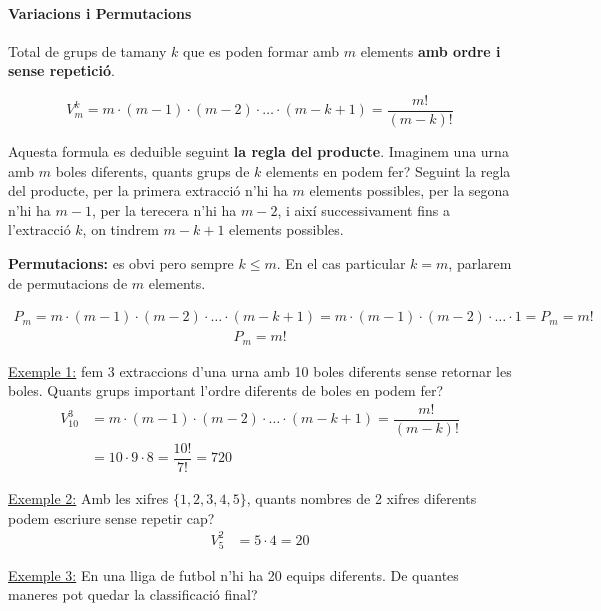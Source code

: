 \documentclass{article}
\begin{document}
\paragraph{Variacions i Permutacions}
Total de grups de tamany $k$ que es poden formar amb $m$ elements \textbf{amb ordre i sense repetició}.

\begin{equation*}
V_m^{k} = m \cdot (m-1) \cdot (m-2) \cdot \ldots \cdot (m-k+1) = \dfrac{m!}{(m-k)!}
\end{equation*}

Aquesta formula es deduible seguint \textbf{la regla del producte}. Imaginem una urna amb $m$ boles diferents, quants grups de $k$ elements en podem fer? Seguint la regla del producte, per la primera extracció n'hi ha $m$ elements possibles, per la segona n'hi ha $m-1$, per la terecera n'hi ha $m-2$, i així successivament fins a l'extracció $k$, on tindrem $m-k+1$ elements possibles.

\textbf{Permutacions:} es obvi pero sempre $k \leq m$. En el cas particular $k = m$, parlarem de
permutacions de $m$ elements.

\begin{equation*}
\begin{split}
P_m = m \cdot (m-1) \cdot (m-2) \cdot \ldots \cdot (m-k+1) = m \cdot (m-1) \cdot (m-2) \cdot \ldots \cdot 1 = P_m = m!
\end{split}
\end{equation*}
\begin{align*}
P_m = m!
\end{align*}

\underline{Exemple 1:} fem 3 extraccions d'una urna amb 10 boles diferents sense retornar les boles. Quants grups important l'ordre diferents de boles en podem fer?
\begin{align*}
V_{10}^{3} & = m \cdot (m-1) \cdot (m-2) \cdot \ldots \cdot (m-k+1) = \dfrac{m!}{(m-k)!} \\
           & = 10 \cdot 9 \cdot 8 = \dfrac{10!}{7!} = 720
\end{align*}

\underline{Exemple 2:} Amb les xifres $\{1, 2, 3, 4, 5\}$, quants nombres de 2 xifres diferents podem
escriure sense repetir cap?
\begin{align*}
V_{5}^{2} & = 5 \cdot 4 = 20
\end{align*}

\underline{Exemple 3:} En una lliga de futbol n'hi ha 20 equips diferents. De quantes maneres pot quedar la classificació final?
\end{document}
